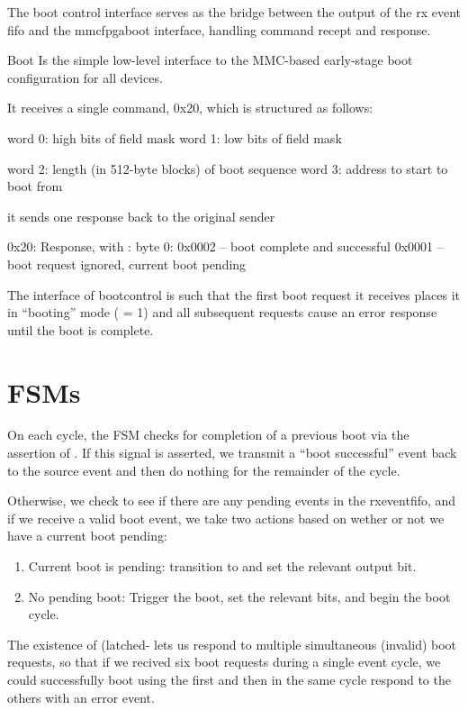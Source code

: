 The boot control interface serves as the bridge between the output of
the rx event fifo and the mmcfpgaboot interface, handling command
recept and response.

Boot Is the simple low-level interface to the MMC-based early-stage
boot configuration for all devices. 

It receives a single command, 0x20, which is structured as follows: 

word 0: high bits of field mask
word 1: low bits of field mask

word 2: length (in 512-byte blocks) of boot sequence
word 3: address to start to boot from

it sends one response back to the original sender


0x20: Response, with : 
   byte 0: 0x0002 -- boot complete and successful
	   0x0001 -- boot request ignored, current boot pending


           The interface of bootcontrol is such that the first boot
           request it receives places it in ``booting'' mode
           ( = 1) and all subsequent requests cause an
           error response until the boot is complete.

\section{FSMs}

On each cycle, the FSM checks for completion of a previous boot via the assertion of . If this signal is asserted, we transmit a ``boot successful'' event back to the source event and then do nothing for the remainder of the cycle. 

Otherwise, we check to see if there are any pending events in the rxeventfifo, and if we receive a valid boot event, we take two actions based on wether or not we have a current boot pending:

\begin{enumerate}
\item Current boot is pending: transition to  and set the relevant output bit.
\item No pending boot: Trigger the boot, set the relevant bits, and begin the boot cycle. 
\end{enumerate}

The existence of  (latched- lets us respond
to multiple simultaneous (invalid) boot requests, so that if we
recived six boot requests during a single event cycle, we could
successfully boot using the first and then in the same cycle respond
to the others with an error event.
